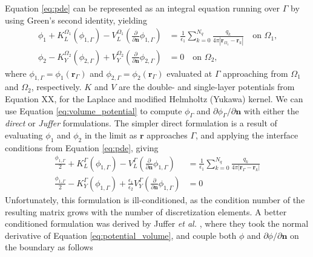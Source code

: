 Equation \eqref{eq:pde} can be represented as an integral equation running over $\Gamma$ by using Green's second identity, yielding
%
\begin{align} \label{eq:volume_potential}
\phi_{1}+ K_{L}^{\Omega_1}(\phi_{1,\Gamma}) -  V_{L}^{\Omega_1} \left(\frac{\partial}{\partial \mathbf{n}}  \phi_{1,\Gamma}  \right) & = \frac{1}{\epsilon_1} \sum_{k=0}^{N_q}  \frac{q_k}{4\pi|\mathbf{r}_{\Omega_1} - \mathbf{r}_k|}  \quad \text{on $\Omega_1$,} \nonumber \\
\phi_{2} - K_{Y}^{\Omega_2}(\phi_{2,\Gamma}) + V_{Y}^{\Omega_2} \left( \frac{\partial}{\partial \mathbf{n}} \phi_{2,\Gamma} \right) & = 0 \quad \text{on $\Omega_2$,}
\end{align}
%
where $\phi_{1,\Gamma} = \phi_1(\mathbf{r}_\Gamma)$ and $\phi_{2,\Gamma} = \phi_2(\mathbf{r}_\Gamma)$ evaluated at $\Gamma$ approaching from $\Omega_1$ and $\Omega_2$, respectively. $K$ and $V$ are the double- and single-layer potentials from Equation XX, for the Laplace and modified Helmholtz (Yukawa) kernel. 
We can use Equation \eqref{eq:volume_potential} to compute $\phi_\Gamma$ and $\partial\phi_\Gamma/\partial\mathbf{n}$ with either the \emph{direct} or \emph{Juffer} formulations.
The simpler direct formulation is a result of evaluating $\phi_1$ and $\phi_2$ in the limit as $\mathbf{r}$ approaches $\Gamma$, and applying the interface conditions from Equation \eqref{eq:pde}, giving
%
\begin{align} \label{eq:direct}
\frac{\phi_{1,\Gamma}}{2}+ K_{L}^{\Gamma}(\phi_{1,\Gamma}) -  V_{L}^{\Gamma} \left(\frac{\partial}{\partial \mathbf{n}}  \phi_{1,\Gamma}  \right) & = \frac{1}{\epsilon_1} \sum_{k=0}^{N_q}  \frac{q_k}{4\pi|\mathbf{r}_{\Gamma} - \mathbf{r}_k|} \nonumber \\
\frac{\phi_{1,\Gamma}}{2} - K_{Y}^{\Gamma}(\phi_{1,\Gamma}) + \frac{\epsilon_1}{\epsilon_2}V_{Y}^{\Gamma} \left( \frac{\partial}{\partial \mathbf{n}} \phi_{1,\Gamma} \right) & = 0
\end{align}
%
Unfortunately, this formulation is ill-conditioned, as the condition number of the resulting matrix grows with the number of discretization elements. 
A better conditioned formulation was derived by Juffer \emph{et al.} \cite{JufferETal1992}, where they took the normal derivative of Equation \eqref{eq:potential_volume}, and couple both $\phi$ and $\partial\phi/\partial\mathbf{n}$ on the boundary as follows
%
\begin{equation}\label{eq:juffer}
\end{equation}

